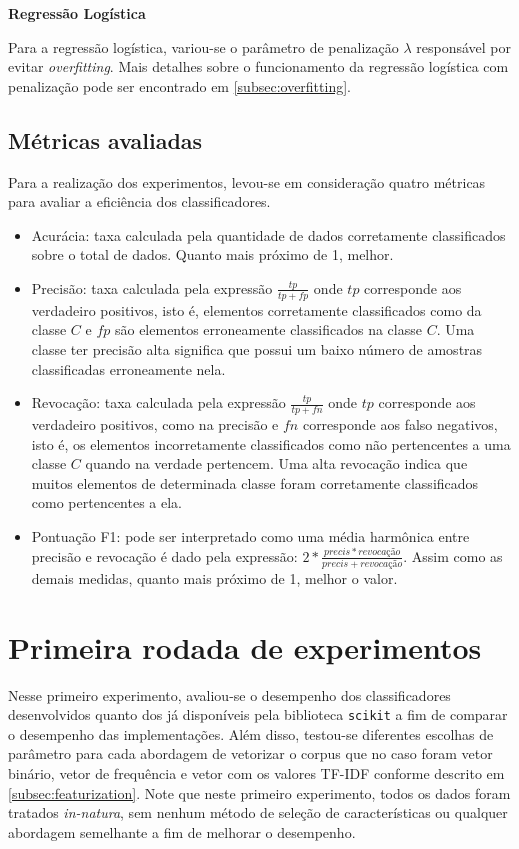 \textbf{Regressão Logística}

Para a regressão logística, variou-se o parâmetro de penalização $\lambda$ responsável por evitar 
\textit{overfitting}. Mais detalhes sobre o funcionamento da regressão logística com penalização
pode ser encontrado em \ref{subsec:overfitting}.


\subsection{Métricas avaliadas}
\label{subsec:metrics}

Para a realização dos experimentos, levou-se em consideração quatro métricas
para avaliar a eficiência dos classificadores.

\begin{itemize}
	\item Acurácia: taxa calculada pela quantidade de dados corretamente classificados
	sobre o total de dados. Quanto mais próximo de 1, melhor.
	\item Precisão: taxa calculada pela expressão $\frac{tp}{tp + fp}$ onde $tp$ corresponde
	aos verdadeiro positivos, isto é, elementos corretamente classificados como da classe $C$
	e $fp$ são elementos erroneamente classificados na classe $C$. Uma classe ter precisão alta
	significa que possui um baixo número de amostras classificadas erroneamente nela.
	\item Revocação: taxa calculada pela expressão $\frac{tp}{tp + fn}$ onde $tp$ corresponde
	aos verdadeiro positivos, como na precisão e $fn$ corresponde
	aos falso negativos, isto é, os elementos incorretamente classificados como não pertencentes
	a uma classe $C$ quando na verdade pertencem. Uma alta revocação indica que muitos elementos
	de determinada classe foram corretamente classificados como pertencentes a ela.
	\item Pontuação F1: pode ser interpretado como uma média harmônica entre precisão e revocação é dado
	pela expressão: $2*\frac{precis*revocação}{precis + revocação}$. Assim como as demais medidas, quanto
	mais próximo de 1, melhor o valor.
\end{itemize}

\section{Primeira rodada de experimentos}
\label{sec:first_experiments}

Nesse primeiro experimento, avaliou-se o desempenho dos classificadores desenvolvidos quanto dos
já disponíveis pela biblioteca \texttt{scikit} a fim de comparar o desempenho das implementações.
Além disso, testou-se diferentes escolhas de parâmetro para cada abordagem de vetorizar o corpus
que no caso foram vetor binário, vetor de frequência e vetor com os valores TF-IDF conforme descrito
em \ref{subsec:featurization}. 
Note que neste primeiro experimento, todos os dados foram tratados \textit{in-natura}, sem nenhum método de seleção de características ou qualquer abordagem semelhante a fim de melhorar o desempenho.

